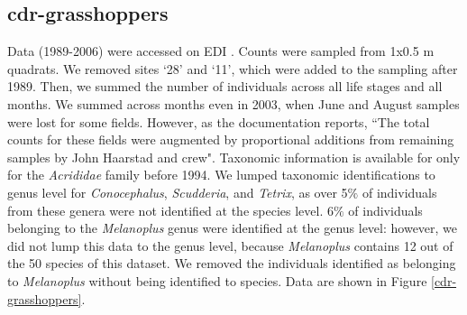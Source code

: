 \documentclass[11pt, oneside]{article}
\begin{document}
\subsection{cdr-grasshoppers}
Data (1989-2006) were accessed on EDI \citep{cdr-grasshoppers}.
Counts were sampled from 1x0.5 m quadrats. 
We removed sites `28' and `11', which were added to the sampling after 1989. 
Then, we summed the number of individuals across all life stages and all months. 
We summed across months even in 2003, when June and August samples were lost for some fields. 
However, as the documentation reports, ``The total counts for these fields were augmented by proportional additions from remaining samples by John Haarstad and crew".
Taxonomic information is available for only for the {\it Acrididae} family before 1994. 
We lumped taxonomic identifications to genus level for {\it Conocephalus}, {\it Scudderia}, and {\it Tetrix}, as over 5$\%$ of individuals from these genera were not identified at the species level. 
6$\%$ of individuals belonging to the {\it Melanoplus} genus were identified at the genus level: however, we did not lump this data to the genus level, because {\it Melanoplus} contains 12 out of the 50 species of this dataset. We removed the individuals identified as belonging to {\it Melanoplus} without being identified to species. 
Data are shown in Figure \ref{cdr-grasshoppers}.
\end{document}

